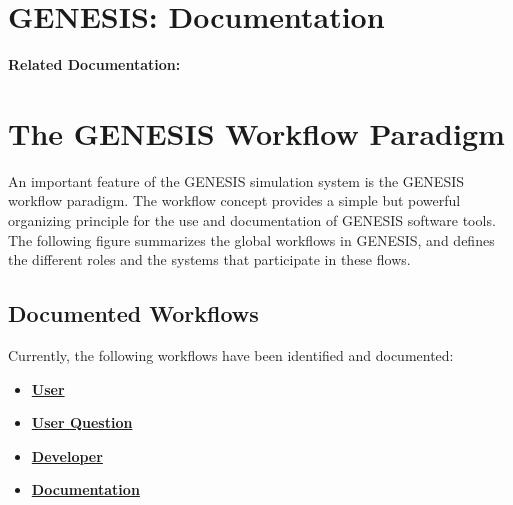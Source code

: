 \documentclass[12pt]{article}
\begin{document}
\section*{GENESIS: Documentation}

{\bf Related Documentation:}

\section*{The GENESIS Workflow Paradigm}

An important feature of the GENESIS simulation system is the GENESIS workflow
paradigm. The workflow concept provides a simple but powerful
organizing principle for the use and documentation of GENESIS software
tools. The following figure summarizes the global workflows in GENESIS, and defines the different roles and the systems that
participate in these flows.

\begin{figure}[h]
  \centering
  \label{fig:wf-1}
\end{figure}

\subsection*{Documented Workflows}
Currently, the following workflows have been identified and documented:
\begin{itemize}
\item \href{../workflow-user/workflow-user.tex}{\bf User}
\item \href{../workflow-user-query/workflow-user-query.tex}{\bf User Question}
\item \href{../workflow-developer/workflow-developer.tex}{\bf Developer}
\item \href{../workflow-documentation/workflow-documentation.tex}{\bf Documentation}
\end{itemize}
\end{document}
